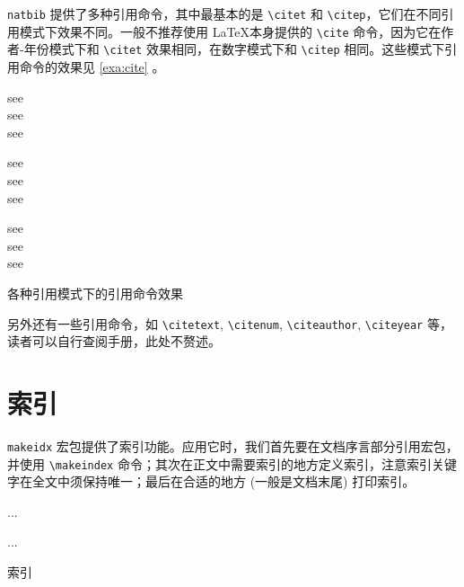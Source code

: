 \texttt{natbib} 提供了多种引用命令，其中最基本的是 \verb|\citet| 和 \verb|\citep|，它们在不同引用模式下效果不同。一般不推荐使用 \LaTeX 本身提供的 \verb|\cite| 命令，因为它在作者-年份模式下和 \verb|\citet| 效果相同，在数字模式下和 \verb|\citep| 相同。这些模式下引用命令的效果见 \autoref{exa:cite} 。

\begin{example}[htbp]
\begin{RLDemo}[numbers=none]
see \cite{Daly_natbib}\\
see \citet{Daly_natbib}\\
see \citep{Daly_natbib}
\end{RLDemo}

\begin{RLDemo}[numbers=none]
see \cite{Daly_natbib}\\
see \citet{Daly_natbib}\\
see \citep{Daly_natbib}
\end{RLDemo}

\begin{RLDemo}[numbers=none]
see \cite{Daly_natbib}\\
see \citet{Daly_natbib}\\
see \citep{Daly_natbib}
\end{RLDemo}
\caption{各种引用模式下的引用命令效果}
\label{exa:cite}
\end{example}

另外还有一些引用命令，如 \verb|\citetext|, \verb|\citenum|, \verb|\citeauthor|, \verb|\citeyear| 等，读者可以自行查阅手册，此处不赘述。

\section{索引}

\texttt{makeidx} 宏包提供了索引功能。应用它时，我们首先要在文档序言部分引用宏包，并使用 \verb|\makeindex| 命令；其次在正文中需要索引的地方定义索引，注意索引关键字在全文中须保持唯一；最后在合适的地方 (一般是文档末尾) 打印索引。

\begin{example}[htbp]
\begin{Code}[]
\usepackage{makeidx}
\makeindex
...

...
\printindex

\end{Code}
\caption{索引}
\label{exa:index}
\end{example}

